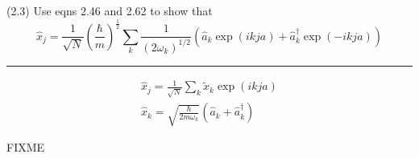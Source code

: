 \documentclass[12pt]{article}
\begin{document}
(2.3)
Use eqns 2.46 and 2.62 to show that
\begin{equation*}
\hat x_j=\frac{1}{\sqrt{N}}
\left(\frac{\hbar}{m}\right)^\frac{1}{2}
\sum_k
\frac{1}{(2\omega_k)^{1/2}}
\left(
\hat a_k\exp(ikja)+\hat a_k^\dag\exp(-ikja)
\right)
\tag{2.68}
\end{equation*}

\hrule

\begin{gather*}
\hat x_j=\frac{1}{\sqrt{N}}
\sum_k
\tilde x_k\exp(ikja)
\tag{2.46}
\\
\hat x_k=\sqrt{\frac{\hbar}{2m\omega_k}}
\left(\hat a_k+\hat a_k^\dag\right)
\tag{2.62}
\end{gather*}

FIXME
\end{document}
